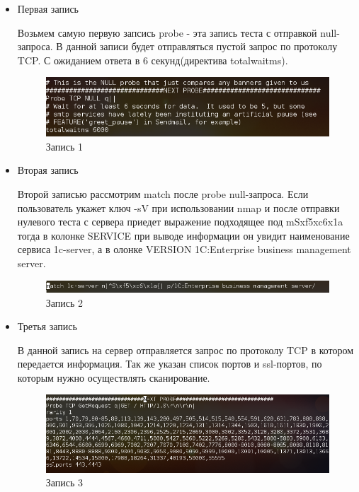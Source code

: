 \documentclass[11pt, a4paper]{article}		%
\begin{document}
\begin{itemize}
\item Первая запись

Возьмем самую первую запсись probe - эта запись теста с отправкой null-запроса. В данной записи будет отправляться пустой запрос по протоколу TCP. С ожиданием ответа в 6 секунд(директива totalwaitms).

\begin{figure}[h!]
\centering
\includegraphics[scale=0.8]{res/probe_1}
\caption{Запись 1}
\end{figure}

\item Вторая запись

Второй записью рассмотрим match после probe null-запроса. Если пользователь укажет ключ -sV при использовании nmap и после отправки нулевого теста с сервера приедет выражение подходящее под mSxf5xc6x1a тогда в колонке SERVICE при выводе информации он увидит наименование сервиса 1c-server, а в олонке VERSION 1C:Enterprise business management server.

\begin{figure}[h!]
\centering
\includegraphics[scale=0.8]{res/probe_2}
\caption{Запись 2}
\end{figure}

\item Третья запись

В данной запись на сервер отправляется запрос по протоколу TCP в котором передается информация. Так же указан список портов и ssl-портов, по которым нужно осуществлять сканирование.

\begin{figure}[h!]
\centering
\includegraphics[scale=0.8]{res/probe_3}
\caption{Запись 3}
\end{figure}


\end{itemize}
\end{document}
